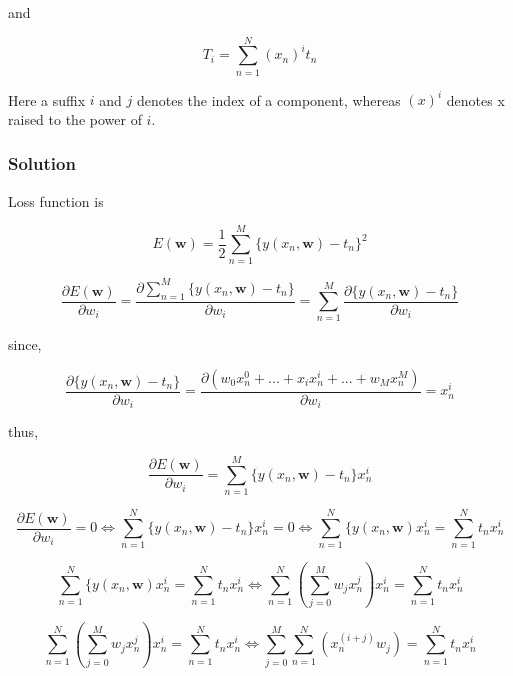 and

\begin{equation}
    T_i = \sum_{n=1}^N (x_n)^it_n
\end{equation}

Here a suffix $i$ and $j$ denotes the index of a component, whereas $(x)^i$ denotes x raised to the power of $i$.

\subsubsection{Solution}

Loss function is

\begin{equation}
    E(\pmb{w}) = \frac{1}{2} \sum_{n=1}^M \{y(x_n, \pmb{w}) - t_n\}^2
\end{equation}

\begin{equation}
    \frac{\partial E(\pmb{w})}{\partial w_i} = \frac{\partial \sum_{n=1}^M \{y(x_n, \pmb{w}) - t_n\}}{\partial w_i} = \sum_{n=1}^M \frac{\partial \{y(x_n, \pmb{w}) - t_n \}}{\partial w_i}
\end{equation}

since,

\begin{equation}
    \frac{\partial \{y(x_n, \pmb{w}) - t_n \}}{\partial w_i} = \frac{\partial (w_0x_n^0 + ... + x_ix_n^i + ... + w_M x_n^M)}{\partial w_i} = x_n^i
\end{equation}

thus,


\begin{equation}
    \frac{\partial E(\pmb{w})}{\partial w_i} = \sum_{n=1}^M \{y(x_n, \pmb{w}) - t_n\} x_n^i
\end{equation}

\begin{equation}
    \frac{\partial E(\pmb{w})}{\partial w_i} = 0 \Leftrightarrow \sum_{n=1}^N \{y(x_n, \pmb{w}) - t_n\}x_n^i = 0 \Leftrightarrow \sum_{n=1}^N \{y(x_n, \pmb{w})x_n^i = \sum_{n=1}^N t_n x_n^i
\end{equation}

\begin{equation}
    \sum_{n=1}^N \{y(x_n, \pmb{w})x_n^i = \sum_{n=1}^N t_n x_n^i \Leftrightarrow \sum_{n=1}^N (\sum_{j=0}^M w_jx_n^j) x_n^i = \sum_{n=1}^N t_n x_n^i
\end{equation}

\begin{equation}
    \sum_{n=1}^N (\sum_{j=0}^M w_jx_n^j) x_n^i = \sum_{n=1}^N t_n x_n^i \Leftrightarrow \sum_{j=0}^M \sum_{n=1}^N (x_n^{(i + j)}w_j) = \sum_{n=1}^N t_nx_n^i
\end{equation}

